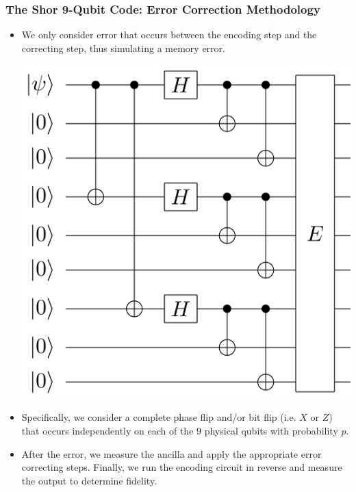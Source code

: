 \documentclass{beamer}
\begin{document}
\begin{frame}
    \frametitle{The Shor 9-Qubit Code: Error Correction Methodology}
        \begin{itemize}
            \item We only consider error that occurs between the encoding step and the correcting step, thus simulating a memory error.
            \begin{center}
                \includegraphics[scale = 0.08]{9qberror.png}
            \end{center}
            \item Specifically, we consider a complete phase flip and/or bit flip (i.e. $X$ or $Z$) that occurs independently on each of the 9 physical qubits with probability $p$.
            \item After the error, we measure the ancilla and apply the appropriate error correcting steps. Finally, we run the encoding circuit in reverse and measure the output to determine fidelity.
        \end{itemize}
\end{frame}
\end{document}
